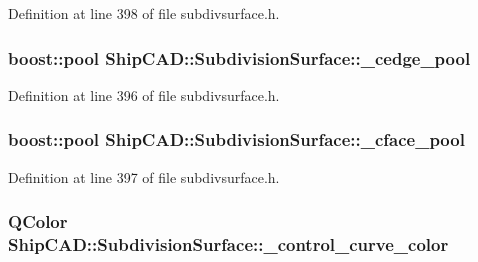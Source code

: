 Definition at line 398 of file subdivsurface.\-h.

\hypertarget{classShipCAD_1_1SubdivisionSurface_a413da68890d958a7994d09e0906be102}{
\subsubsection[{\-\_\-cedge\-\_\-pool}]{\setlength{\rightskip}{0pt plus 5cm}boost\-::pool Ship\-C\-A\-D\-::\-Subdivision\-Surface\-::\-\_\-cedge\-\_\-pool\hspace{0.3cm}{\ttfamily [protected]}}}\label{classShipCAD_1_1SubdivisionSurface_a413da68890d958a7994d09e0906be102}


Definition at line 396 of file subdivsurface.\-h.

\hypertarget{classShipCAD_1_1SubdivisionSurface_a6bb58101a0ee9c4f06e1fdf86f0cded1}{
\subsubsection[{\-\_\-cface\-\_\-pool}]{\setlength{\rightskip}{0pt plus 5cm}boost\-::pool Ship\-C\-A\-D\-::\-Subdivision\-Surface\-::\-\_\-cface\-\_\-pool\hspace{0.3cm}{\ttfamily [protected]}}}\label{classShipCAD_1_1SubdivisionSurface_a6bb58101a0ee9c4f06e1fdf86f0cded1}


Definition at line 397 of file subdivsurface.\-h.

\hypertarget{classShipCAD_1_1SubdivisionSurface_af0385bc183e805c1adc23750747a43d7}{
\subsubsection[{\-\_\-control\-\_\-curve\-\_\-color}]{\setlength{\rightskip}{0pt plus 5cm}Q\-Color Ship\-C\-A\-D\-::\-Subdivision\-Surface\-::\-\_\-control\-\_\-curve\-\_\-color\hspace{0.3cm}{\ttfamily [protected]}}}\label{classShipCAD_1_1SubdivisionSurface_af0385bc183e805c1adc23750747a43d7}


